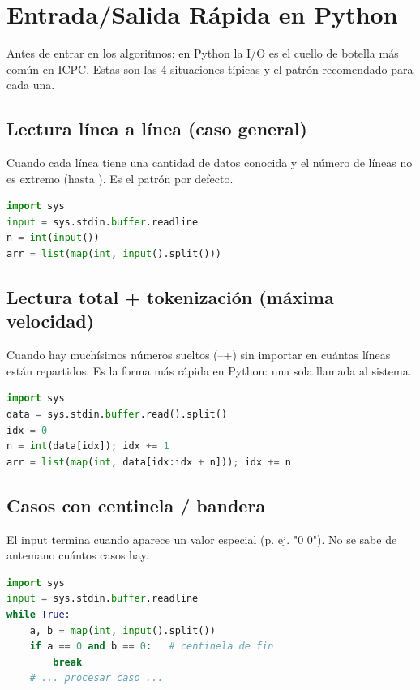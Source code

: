 \section{Entrada/Salida Rápida en Python}

Antes de entrar en los algoritmos: en Python la I/O es el cuello de botella más común en ICPC. Estas son las 4 situaciones típicas y el patrón recomendado para cada una.

\subsection{Lectura línea a línea (caso general)}

Cuando cada línea tiene una cantidad de datos conocida y el número de líneas no es extremo (hasta ). Es el patrón por defecto.

\begin{lstlisting}[language=Python]
import sys
input = sys.stdin.buffer.readline
n = int(input())
arr = list(map(int, input().split()))
\end{lstlisting}

\subsection{Lectura total + tokenización (máxima velocidad)}

Cuando hay muchísimos números sueltos (--+) sin importar en cuántas líneas están repartidos. Es la forma más rápida en Python: una sola llamada al sistema.

\begin{lstlisting}[language=Python]
import sys
data = sys.stdin.buffer.read().split()
idx = 0
n = int(data[idx]); idx += 1
arr = list(map(int, data[idx:idx + n])); idx += n
\end{lstlisting}

\subsection{Casos con centinela / bandera}

El input termina cuando aparece un valor especial (p. ej. "0 0"). No se sabe de antemano cuántos casos hay.

\begin{lstlisting}[language=Python]
import sys
input = sys.stdin.buffer.readline
while True:
    a, b = map(int, input().split())
    if a == 0 and b == 0:   # centinela de fin
        break
    # ... procesar caso ...
\end{lstlisting}

